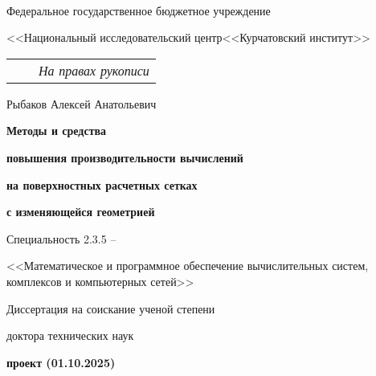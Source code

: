 \documentclass[a4paper,14pt]{extarticle}                     %
\numberwithin{equation}{section}                             %
\numberwithin{figure}{section}                               %
\numberwithin{table}{section}                                %
\theoremstyle{plain}                                         %
\numberwithin{theorem}{section}                              %
\numberwithin{lemma}{section}                                %
\numberwithin{definition}{section}                           %
\numberwithin{algo}{section}                                 %
\begin{document}

\thispagestyle{empty}

\

{\centering Федеральное государственное бюджетное учреждение\par <<Национальный исследовательский центр<<Курчатовский институт>>}

\vspace{0pt plus1fill} %

\noindent%
\begin{tabularx}{\textwidth}{@{}lXr@{}}%
    & & \textit{На правах рукописи}\\
\end{tabularx}

\vspace{0pt plus4fill} %
\begin{center}
Рыбаков Алексей Анатольевич
\end{center}

\vspace{0pt plus1.5fill} %
\begin{center}
\textbf{\large Методы и средства}

\textbf{\large повышения производительности вычислений}

\textbf{\large на поверхностных расчетных сетках}

\textbf{\large с изменяющейся геометрией}

\vspace{0pt plus2fill} %
{Специальность 2.3.5 --\par <<Математическое и программное обеспечение вычислительных систем, комплексов и компьютерных сетей>>}

\vspace{0pt plus1.5fill} %
Диссертация на соискание ученой степени\par доктора технических наук\par
\textbf{проект (01.10.2025)}
\end{center}
\end{document}
